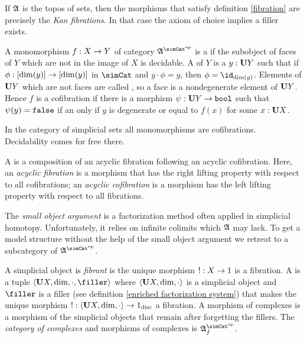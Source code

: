 \documentclass[csh.tex]{subfiles}
\begin{document}
\begin{example} If $\mathfrak A$ is the topos of sets, then the morphisms that satisfy definition \ref{fibration} are precisely the \emph{Kan fibrations}. In that case the axiom of choice implies a filler exists. \end{example}

\begin{definition} A monomorphism $f: X\to Y$ of category $\ambient\s$ is a  if the subobject of faces of $Y$ which are not in the image of $X$ is decidable. A  of $Y$ is a $y:\mathbf{U} Y$ such that if $\phi: [\dim(y)]\to [\dim(y)]$ in $\simCat$ and $y\cdot \phi = y$, then $\phi = \id_{\dim(y)}$. Elements of $\mathbf{U} Y$ which are not faces are called , so a face is a nondegenerate element of $\mathbf{U} Y$. Hence $f$ is a cofibration if there is a morphism $\psi:\mathbf{U} Y\to\mathtt{bool}$ such that $\psi(y)=\mathtt{false}$ if an only if $y$ is degenerate or equal to $f(x)$ for some $x: \mathbf{U} X$.\end{definition}

\begin{example} In the category of simplicial sets all monomorphisms are cofibrations. Decidability comes for free there.\end{example}

\begin{definition} A  is a composition of an acyclic fibration following an acyclic cofibration. Here, an \emph{acyclic fibration} is a morphism that has the right lifting property with respect to all cofibrations; an \emph{acyclic cofibration} is a morphism has the left lifting property with respect to all fibrations.
\end{definition}

The \emph{small object argument} is a factorization method often applied in simplicial homotopy. Unfortunately, it relies on infinite colimits which $\mathfrak A$ may lack. To get a model structure without the help of the small object argument we retreat to a subcategory of $\ambient\s$.

\begin{definition} A simplicial object is \emph{fibrant} is the unique morphism $!: X\to 1$ is a fibration.
A  is a tuple $\tuplet{\base X,\dim,\cdot,\filler}$ where $\left\langle \mathbf{U} X,\dim,\cdot \right\rangle$ is a simplicial object and $\filler$ is a filler (see definition \ref{enriched factorization system}) that makes the unique morphism $!: \left\langle \mathbf{U} X,\dim,\cdot \right\rangle\to 1_{\rm disc}$ a fibration. A morphism of complexes is a morphism of the simplicial objects that remain after forgetting the fillers. The \emph{category of complexes} and morphisms of complexes is $\ambient\s\f$.
\end{definition}
\end{document}
